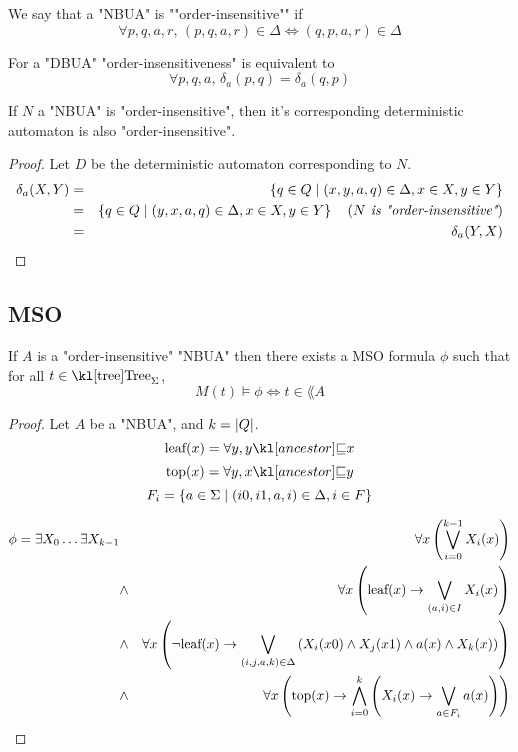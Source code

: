 \documentclass{article}
\begin{document}
\begin{definition}
	We say that a "NBUA" is ""order-insensitive"" if
	\[ \forall p,q,a,r,\, (p,q,a,r) \in \Delta \iff  (q,p,a,r) \in \Delta \]
\end{definition}

\begin{remark}
	For a "DBUA" "order-insensitiveness" is equivalent to
	\[ \forall p,q,a,\, \delta_a (p,q) = \delta_a (q,p) \]
\end{remark}

\begin{lemma}
	If $N$ a "NBUA" is "order-insensitive", then it's corresponding deterministic automaton is also "order-insensitive".
\end{lemma}

\begin{proof}
	Let $D$ be the deterministic automaton corresponding to $N$.
	\begin{eqnarray*}
		\delta_a (X,Y) &=& \left\{q \in Q \mid (x,y,a,q) \in \Delta, x \in X, y \in Y\right\} \\
		&=& \left\{q \in Q \mid (y,x,a,q) \in \Delta, x \in X, y \in Y\right\}  \quad\left(\textit{$N$ is "order-insensitive"}\right) \\
		&=& \delta_a (Y,X)
	\end{eqnarray*}
\end{proof}

\subsection{MSO}

\begin{lemma}
	If $A$ is a "order-insensitive" "NBUA"  then there exists a MSO formula $\phi$ such that for all $t \in \tree_{\Sigma}$,
	\[ M(t) \models \phi \iff t \in \lang A \]
\end{lemma}

\begin{proof}
	Let $A$ be a "NBUA", and $k = \left|Q\right|$.
	\[\text{leaf} (x) = \forall y, \ancestor y x \]
	\[\text{top} (x) = \forall y, \ancestor x y \]
	\[F_i = \left\{a \in \Sigma \mid (i0,i1,a,i) \in \Delta, i \in F\right\}\]


	\begin{eqnarray*}
		\phi = \exists X_0 \ldots \exists X_{k-1} &\ & \forall x \left( \bigvee_{i=0}^{k-1} X_i(x) \right) \\
		&\land& \forall x \left( \text{leaf} (x) \rightarrow \bigvee_{(a,i)\in I}  X_i(x)   \right) \\
		&\land& \forall x \left(\lnot \text{leaf}(x) \rightarrow \bigvee_{(i,j,a,k)\in \Delta}  \left(X_i(x0) \land X_j(x1) \land a(x) \land X_k(x)\right)\right) \\
		&\land& \forall x \left(\text{top}(x) \rightarrow \bigwedge_{i= 0}^k \left( X_i(x) \rightarrow \bigvee_{a \in F_i} a(x) \right)\right)
	\end{eqnarray*}


\end{proof}





\end{document}

